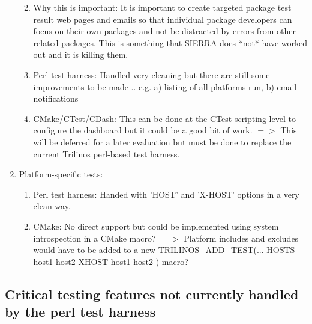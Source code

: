 \documentclass[pdf,ps2pdf,11pt]{SANDreport}
\begin{document}
\begin{enumerate}
\begin{enumerate}
  {}\item Why this is important: It is important to create targeted
  package test result web pages and emails so that individual
  package developers can focus on their own packages and not be
  distracted by errors from other related packages.  This is
  something that SIERRA does *not* have worked out and it is killing
  them.

  {}\item Perl test harness: Handled very cleaning but there are
  still some improvements to be made .. e.g. a) listing of all
  platforms run, b) email notifications

  {}\item CMake/CTest/CDash: This can be done at the CTest scripting
  level to configure the dashboard but it could be a good bit of
  work. $=>$ This will be deferred for a later evaluation but must
  be done to replace the current Trilinos perl-based test harness.

  \end{enumerate}

{}\item Platform-specific tests:

  \begin{enumerate}

  {}\item Perl test harness: Handed with 'HOST' and 'X-HOST' options
  in a very clean way.

  {}\item CMake: No direct support but could be implemented using
  system introspection in a CMake macro?  $=>$ Platform includes and
  excludes would have to be added to a new TRILINOS\_ADD\_TEST(...
  HOSTS host1 host2 XHOST host1 host2 ) macro?

  \end{enumerate}

\end{enumerate}

%
{}\subsection{Critical testing features not currently handled by the perl
test harness}
%
\end{document}
